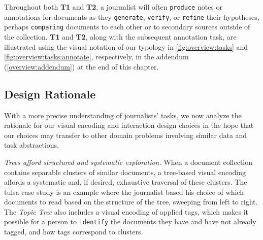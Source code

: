 Throughout both {\bf T1} and {\bf T2}, a journalist will often {\tt produce} notes or annotations for documents as they {\tt generate}, {\tt verify}, or {\tt refine} their hypotheses, perhaps {\tt comparing} documents to each other or to secondary sources outside of the collection.
{\bf T1} and {\bf T2}, along with the subsequent annotation task, are illustrated using the visual notation of our typology in \autoref{fig:overview:tasks} and \autoref{fig:overview:tasks:annotate}, respectively, in the addendum (\autoref{overview:addendum}) at the end of this chapter.


\subsection{Design Rationale}
\label{overview:rationale}


With a more precise understanding of journalists' tasks, we now analyze the rationale for our visual encoding and interaction design choices in the hope that our choices may transfer to other domain problems involving similar data and task abstractions.

{\it Trees afford structured and systematic exploration.}
When a document collection contains separable clusters of similar documents, a tree-based visual encoding affords a systematic and, if desired, exhaustive traversal of these clusters. 
The {\sc tulsa} case study is an example where the journalist based his choice of which documents to read based on the structure of the tree, sweeping from left to right.
The {\it Topic Tree} also includes a visual encoding of applied tags, which makes it possible for a person to {\tt identify} the documents they have and have not already tagged, and how tags correspond to clusters.

